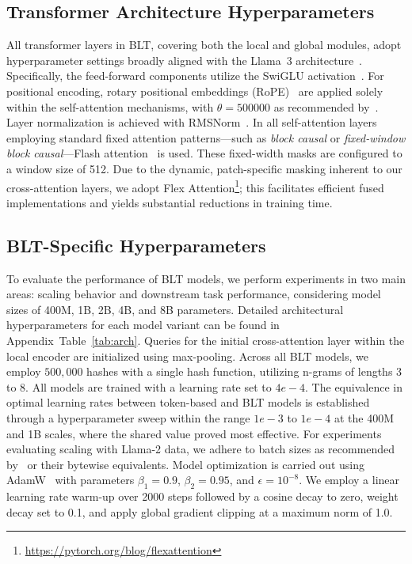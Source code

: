 \subsection{Transformer Architecture Hyperparameters}  
All transformer layers in {\textsc BLT}, covering both the local and global modules, adopt hyperparameter settings broadly aligned with the Llama~3 architecture~\citep{dubey2024llama}. Specifically, the feed-forward components utilize the SwiGLU activation~\citep{swiglu}. For positional encoding, rotary positional embeddings (RoPE)~\citep{RoPe} are applied solely within the self-attention mechanisms, with $\theta=500000$ as recommended by~\citet{xiong2024effective}. Layer normalization is achieved with RMSNorm~\citep{RMSNorm}. In all self-attention layers employing standard fixed attention patterns—such as \textit{block causal} or \textit{fixed-window block causal}—Flash attention~\citep{dao2022flashattention} is used. These fixed-width masks are configured to a window size of 512. Due to the dynamic, patch-specific masking inherent to our cross-attention layers, we adopt Flex Attention\footnote{\url{https://pytorch.org/blog/flexattention}}; this facilitates efficient fused implementations and yields substantial reductions in training time.

\subsection{{\textsc BLT}-Specific Hyperparameters} To evaluate the performance of {\textsc BLT} models, we perform experiments in two main areas: scaling behavior and downstream task performance, considering model sizes of 400M, 1B, 2B, 4B, and 8B parameters. Detailed architectural hyperparameters for each model variant can be found in Appendix~Table~\ref{tab:arch}. Queries for the initial cross-attention layer within the local encoder are initialized using max-pooling. Across all {\textsc BLT} models, we employ $500,000$ hashes with a single hash function, utilizing n-grams of lengths 3 to 8. All models are trained with a learning rate set to $4e-4$. The equivalence in optimal learning rates between token-based and {\textsc BLT} models is established through a hyperparameter sweep within the range $1e-3$ to $1e-4$ at the 400M and 1B scales, where the shared value proved most effective. For experiments evaluating scaling with Llama-2 data, we adhere to batch sizes as recommended by~\cite{dubey2024llama} or their bytewise equivalents. Model optimization is carried out using AdamW~\citep{adamw} with parameters $\beta_1 = 0.9$, $\beta_2 = 0.95$, and $\epsilon=10^{-8}$. We employ a linear learning rate warm-up over 2000 steps followed by a cosine decay to zero, weight decay set to 0.1, and apply global gradient clipping at a maximum norm of 1.0.

